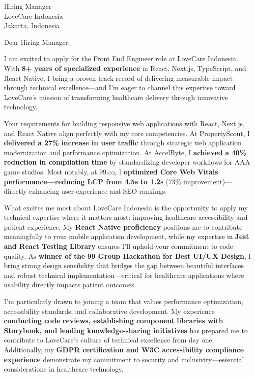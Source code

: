 \documentclass[11pt,a4paper]{letter}
\begin{document}
\begin{letter}{%
    Hiring Manager \\
    LoveCare Indonesia \\
    Jakarta, Indonesia
}

\opening{Dear Hiring Manager,}

I am excited to apply for the Front End Engineer role at LoveCare Indonesia. With \textbf{8+ years of specialized experience} in React, Next.js, TypeScript, and React Native, I bring a proven track record of delivering measurable impact through technical excellence---and I'm eager to channel this expertise toward LoveCare's mission of transforming healthcare delivery through innovative technology.

\vspace{10pt}

Your requirements for building responsive web applications with React, Next.js, and React Native align perfectly with my core competencies. At PropertyScout, I \textbf{delivered a 27\% increase in user traffic} through strategic web application modernization and performance optimization. At AccelByte, I \textbf{achieved a 40\% reduction in compilation time} by standardizing developer workflows for AAA game studios. Most notably, at 99.co, I \textbf{optimized Core Web Vitals performance---reducing LCP from 4.5s to 1.2s} (73\% improvement)---directly enhancing user experience and SEO rankings.

\vspace{10pt}

What excites me most about LoveCare Indonesia is the opportunity to apply my technical expertise where it matters most: improving healthcare accessibility and patient experience. My \textbf{React Native proficiency} positions me to contribute meaningfully to your mobile application development, while my expertise in \textbf{Jest and React Testing Library} ensures I'll uphold your commitment to code quality. As \textbf{winner of the 99 Group Hackathon for Best UI/UX Design}, I bring strong design sensibility that bridges the gap between beautiful interfaces and robust technical implementation---critical for healthcare applications where usability directly impacts patient outcomes.

\vspace{10pt}

I'm particularly drawn to joining a team that values performance optimization, accessibility standards, and collaborative development. My experience \textbf{conducting code reviews, establishing component libraries with Storybook, and leading knowledge-sharing initiatives} has prepared me to contribute to LoveCare's culture of technical excellence from day one. Additionally, my \textbf{GDPR certification and W3C accessibility compliance experience} demonstrate my commitment to security and inclusivity---essential considerations in healthcare technology.


\end{letter}
\end{document}
